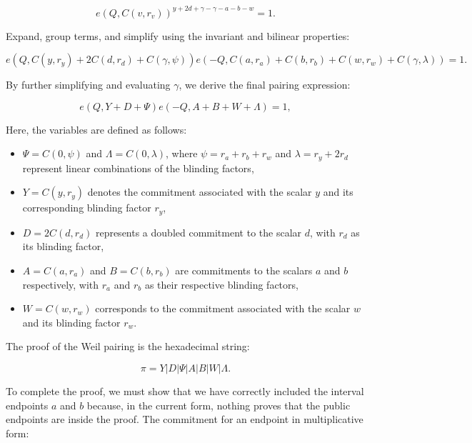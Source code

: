 \documentclass[version=preprint]{iacrcc}
\begin{document}
\begin{equation}
e(Q, C(v, r_{v}))^{y + 2d + \gamma - \gamma - a - b - w} = 1.
\end{equation}

Expand, group terms, and simplify using the invariant and bilinear properties:

\begin{equation}
e(Q, C(y, r_{y}) + 2 C(d, r_{d}) + C(\gamma, \psi))e(-Q, C(a, r_{a}) + C(b, r_{b}) + C(w, r_{w}) + C(\gamma, \lambda)) = 1.
\end{equation}

By further simplifying and evaluating \( \gamma \), we derive the final pairing expression:

\begin{equation}
e(Q, Y + D + \Psi)e(-Q, A + B + W + \Lambda) = 1,
\end{equation}

Here, the variables are defined as follows:

\begin{itemize}
    \item \( \Psi = C(0, \psi) \) and \( \Lambda = C(0, \lambda) \), where \( \psi = r_{a} + r_{b} + r_{w} \) and \( \lambda = r_{y} + 2r_{d} \) represent linear combinations of the blinding factors,
    \item \( Y = C(y, r_{y}) \) denotes the commitment associated with the scalar \( y \) and its corresponding blinding factor \( r_{y} \),
    \item \( D = 2C(d, r_{d}) \) represents a doubled commitment to the scalar \( d \), with \( r_{d} \) as its blinding factor,
    \item \( A = C(a, r_{a}) \) and \( B = C(b, r_{b}) \) are commitments to the scalars \( a \) and \( b \) respectively, with \( r_{a} \) and \( r_{b} \) as their respective blinding factors,
    \item \( W = C(w, r_{w}) \) corresponds to the commitment associated with the scalar \( w \) and its blinding factor \( r_{w} \).
\end{itemize}

The proof of the Weil pairing is the hexadecimal string:

\begin{equation}
\pi = Y | D | \Psi | A | B | W | \Lambda.
\end{equation}

To complete the proof, we must show that we have correctly included the interval endpoints \( a \) and \( b \) because, in the current form, nothing proves that the public endpoints are inside the proof. The commitment for an endpoint in multiplicative form:
\end{document}

